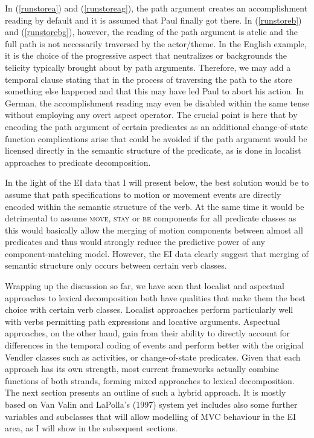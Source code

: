 In (\ref{runstorea}) and (\ref{runstoreag}), the path argument creates an accomplishment reading by default and it is assumed that Paul finally got there. In (\ref{runstoreb}) and (\ref{runstorebg}), however, the reading of the path argument is atelic and the full path is not necessarily traversed by the actor/theme. In the English example, it is the choice of the progressive aspect that neutralizes or backgrounds the telicity typically brought about by path arguments. Therefore, we may add a temporal clause stating that in the process of traversing the path to the store something else happened and that this may have led Paul to abort his action. In German, the accomplishment reading may even be disabled within the same tense without employing any overt aspect operator. The crucial point is here that by encoding the path argument of certain predicates as an additional change-of-state function complications arise that could be avoided if the path argument would be licensed directly in the semantic structure of the predicate, as is done in localist approaches to predicate decomposition.

In the light of the EI data that I will present below, the best solution would be to assume that path specifications to motion or movement events are directly encoded within the semantic structure of the verb. At the same time it would be detrimental to assume \textsc{move}, \textsc{stay} or \textsc{be} components for all predicate classes as this would basically allow the merging of motion components between almost all predicates and thus would strongly reduce the predictive power of any component-matching model. However, the EI data clearly suggest that merging of semantic structure only occurs between certain verb classes.

Wrapping up the discussion so far, we have seen that localist and aspectual approaches to lexical decomposition both have qualities that make them the best choice with certain verb classes. Localist approaches perform particularly well with verbs permitting path expressions and locative arguments. Aspectual approaches, on the other hand, gain from their ability to directly account for differences in the temporal coding of events and perform better with the original Vendler classes such as activities, or change-of-state predicates. Given that each approach has its own strength, most current frameworks actually combine functions of both strands, forming mixed approaches to lexical decomposition. The next section presents an outline of such a hybrid approach. It is mostly based on Van Valin and LaPolla's (1997) system yet includes also some further variables and subclasses that will allow modelling of MVC behaviour in the EI area, as I will show in the subsequent sections.

